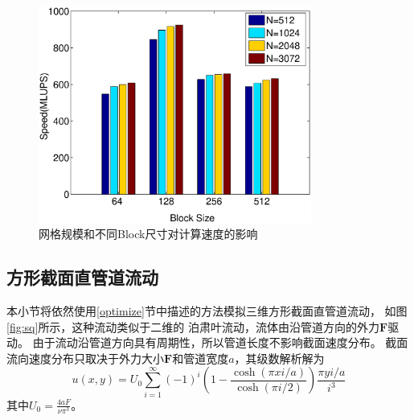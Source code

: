\begin{figure}[htb]
  \centering
  \includegraphics[width=0.8\textwidth]{img/ldc_speed}
  \caption{网格规模和不同Block尺寸对计算速度的影响}
  \label{fig:ldc_speed}
\end{figure}

\subsection{方形截面直管道流动}\label{sq}
本小节将依然使用\ref{optimize}节中描述的方法模拟三维方形截面直管道流动，
如图\ref{fig:sq}所示，这种流动类似于二维的
泊肃叶流动，流体由沿管道方向的外力$\bm F$驱动。
由于流动沿管道方向具有周期性，所以管道长度不影响截面速度分布。
截面流向速度分布只取决于外力大小$\bm F$和管道宽度$a$，其级数解析解为
\begin{equation}
  u(x, y) = U_0\sum_{i=1}^{\infty}(-1)^i\left(1-\frac{\cosh(\pi xi/a)}{\cosh(\pi i/2)}\right)\frac{\pi yi/a}{i^3}
  \label{sq_ana}
\end{equation}
其中$U_0=\frac{4aF}{\nu \pi^3}$。

